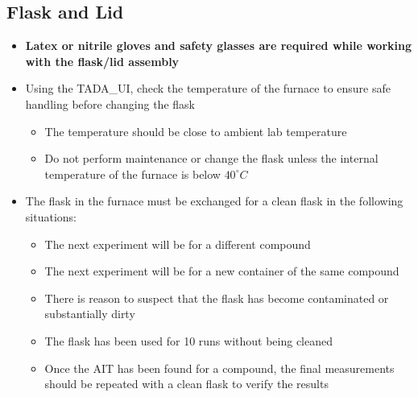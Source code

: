 \documentclass[letterpaper,11pt]{article}
\begin{document}
\subsection{Flask and Lid} \label{sec:flask_lid}
    \begin{itemize}
    \item \textbf{Latex or nitrile gloves and safety glasses are 
            required while working with the flask/lid assembly}
    
    \item Using the TADA\_UI, check the temperature of the furnace to ensure 
        safe handling before changing the flask
        \begin{itemize}
        \item The temperature should be close to ambient lab temperature
        \item Do not perform maintenance or change the flask unless the 
            internal temperature of the furnace is below $40^\circ C$
        \end{itemize}
    
    \item The flask in the furnace must be exchanged for a clean flask in the 
        following situations:
        \begin{itemize}
        \item The next experiment will be for a different compound
        \item The next experiment will be for a new container of the same 
            compound
        \item There is reason to suspect that the flask has become 
            contaminated or substantially dirty
        \item The flask has been used for 10 runs without being cleaned
        \item Once the AIT has been found for a compound, the final measurements
            should be repeated with a clean flask to verify the results
        \end{itemize}
    

\end{itemize}
\end{document}
